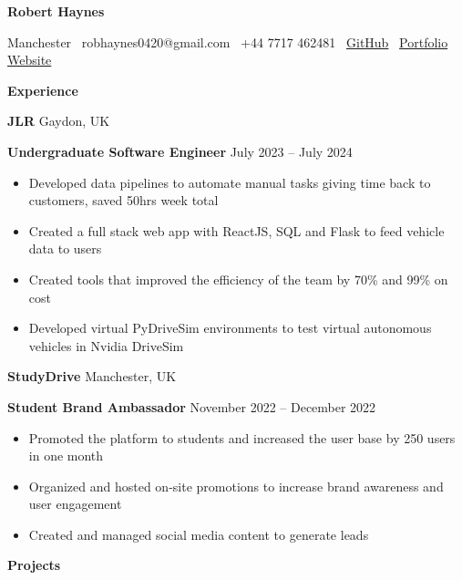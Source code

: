 \documentclass[11pt]{article}
\begin{document}
\begin{center}
    \textbf{Robert Haynes}\\ 
    \hrulefill
\end{center}

\begin{center}
    Manchester \textbullet \ robhaynes0420@gmail.com \textbullet \ +44 7717 462481 \textbullet \ \href{https://github.com/robbiehaynes}{GitHub} \textbullet \ \href{https://www.haynoway.com}{Portfolio Website}
\end{center}

\vspace{0.5pt}

\begin{center}
    \textbf{Experience}
\end{center}
\textbf{JLR} \hfill Gaydon, UK

\textbf{Undergraduate Software Engineer} \hfill July 2023 – July 2024
\begin{itemize}[noitemsep, topsep=0pt, partopsep=0pt, parsep=0pt]
    \item Developed data pipelines to automate manual tasks giving time back to customers, saved 50hrs week total
    \item Created a full stack web app with ReactJS, SQL and Flask to feed vehicle data to users
    \item Created tools that improved the efficiency of the team by 70\% and 99\% on cost 
    \item Developed virtual PyDriveSim environments to test virtual autonomous vehicles in Nvidia DriveSim
\end{itemize}

\vspace{12pt}

\textbf{StudyDrive} \hfill Manchester, UK

\textbf{Student Brand Ambassador} \hfill November 2022 – December 2022
\begin{itemize}[noitemsep, topsep=0pt, partopsep=0pt, parsep=0pt]
    \item Promoted the platform to students and increased the user base by 250 users in one month
    \item Organized and hosted on-site promotions to increase brand awareness and user engagement
    \item Created and managed social media content to generate leads
\end{itemize}

\begin{center}
    \textbf{Projects}
\end{center}
\end{document}
